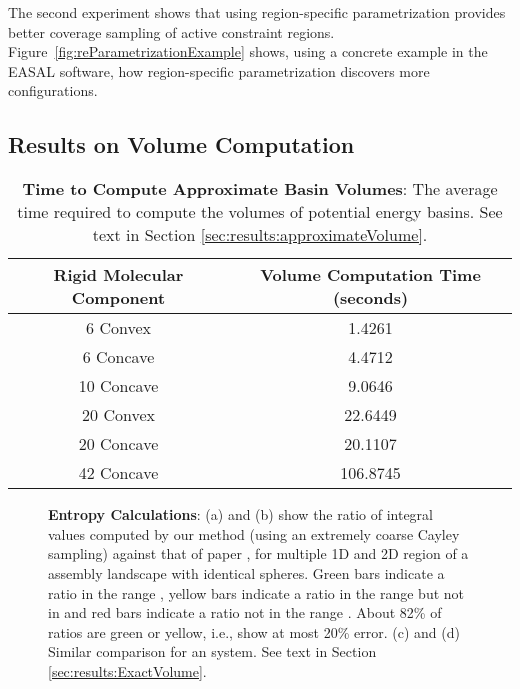 \documentclass[]{article}
\newcommand{\figref}[1]{Figure~\ref{#1}}
\begin{document}
The second experiment shows that using region-specific parametrization provides
better coverage sampling of active constraint regions.
\figref{fig:reParametrizationExample} shows, using a concrete example in the
EASAL software, how region-specific parametrization discovers more
configurations.

\subsection{Results on Volume Computation}
\label{sec:results:Volumes}
\begin{table}[htpb]
\centering
\begin{tabular}{cc}\hline
Rigid Molecular Component&Volume Computation Time (seconds)\\\hline
6 Convex&	1.4261\\\hline
6 Concave& 4.4712\\\hline
10 Concave& 9.0646\\\hline
20 Convex& 22.6449\\\hline
20 Concave& 20.1107\\\hline
42 Concave& 106.8745\\ \hline
\end{tabular}
\caption{\scriptsize \textbf{Time to Compute Approximate Basin Volumes}: 
The average time required to compute the volumes of potential energy basins. 
See text in Section \ref{sec:results:approximateVolume}.
}
\label{table:BasinVolume}
\end{table}
\begin{figure*}[htpb]
   \centering
{}
\caption{\scriptsize \textbf{Entropy Calculations}: (a) and (b) show the ratio of integral values computed by our 
method (using an extremely coarse Cayley sampling) against that of paper \cite{Holmes-Cerfon2013}, for 
multiple 1D and 2D region of a  assembly landscape with  identical spheres.
Green bars indicate a ratio in the range , yellow bars
indicate a ratio in the range  but not in  and red bars indicate a ratio not in the range .
About 82\% of ratios are green or yellow, i.e., show at most 20\% error.
(c) and (d) Similar comparison for an  system.
See text in Section \ref {sec:results:ExactVolume}.}
\label{fig:result_v7}
\end{figure*}
\end{document}
